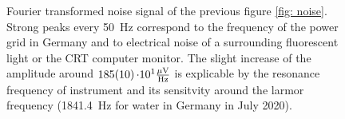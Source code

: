 \begin{figure}[H]
    \centering
    
    \caption[Fourier transformed noise signal of the previous figure \ref{fig: noise}.]{Fourier transformed noise signal of the previous figure \ref{fig: noise}.
    Strong peaks every \SI{50}{\hertz} correspond to the frequency of the power grid in Germany and to electrical noise of a surrounding fluorescent light or the CRT computer monitor.
    The slight increase of the amplitude around $\SI{185 \pm 10}{\cdot 10^1 \frac{\mu \volt}{\hertz}}$ is explicable by the resonance frequency of instrument and its sensitvity around the larmor frequency (\SI{1841.4}{\hertz} for water in Germany in July 2020).}
    \label{fig: MonitorNoise138}
\end{figure}